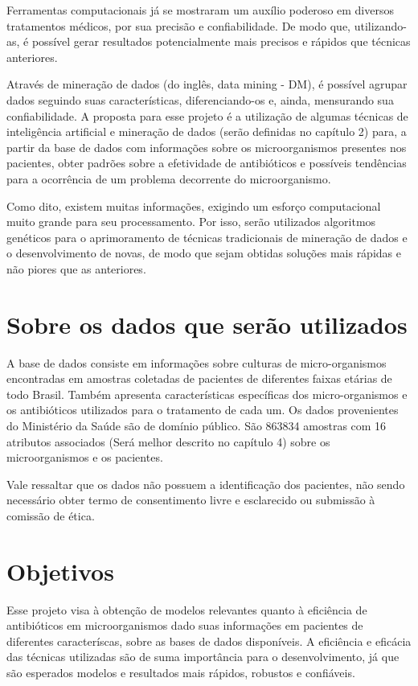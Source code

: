 Ferramentas computacionais já se mostraram um auxílio poderoso em diversos tratamentos 
médicos, por sua precisão e confiabilidade. De modo que, utilizando-as, é possível 
gerar resultados potencialmente mais precisos e rápidos que técnicas anteriores. 

Através de mineração de dados (do inglês, data mining - DM), é possível agrupar dados 
seguindo suas características, diferenciando-os e, ainda, mensurando sua 
confiabilidade. A proposta para esse projeto é a utilização de algumas técnicas de 
inteligência artificial e mineração de dados (serão definidas no capítulo 2) para, a 
partir da base de dados com informações sobre os microorganismos presentes nos 
pacientes, obter padrões sobre a efetividade de antibióticos e possíveis tendências 
para a ocorrência de um problema decorrente do microorganismo.

Como dito, existem muitas informações, exigindo um esforço computacional muito grande 
para seu processamento. Por isso, serão utilizados algoritmos genéticos para o 
aprimoramento de técnicas tradicionais de mineração de dados e o desenvolvimento de 
novas, de modo que sejam obtidas soluções mais rápidas e não piores que as anteriores.
\section{Sobre os dados que serão utilizados}%
A base de dados consiste em informações sobre culturas de micro-organismos encontradas 
em amostras coletadas de pacientes de diferentes faixas etárias de todo Brasil. Também 
apresenta características específicas dos micro-organismos e os antibióticos utilizados 
para o tratamento de cada um. Os dados provenientes do Ministério da Saúde são de 
domínio público. São 863834 amostras com 16 atributos associados (Será melhor descrito 
no capítulo 4) sobre os microorganismos e os pacientes. 

Vale ressaltar que os dados não possuem a identificação dos pacientes, não sendo necessário
obter termo de consentimento livre e esclarecido ou submissão à comissão de ética.
\section{Objetivos}
Esse projeto visa à obtenção de modelos relevantes quanto à eficiência de antibióticos
em microorganismos dado suas informações em pacientes de diferentes caracteríscas, 
sobre as bases de dados disponíveis. A eficiência e eficácia das técnicas utilizadas 
são de suma importância para o desenvolvimento, já que  são esperados modelos e 
resultados mais rápidos, robustos e confiáveis. 

